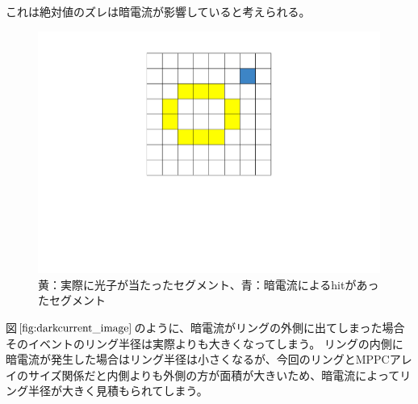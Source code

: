 \documentclass[uplatex, titlepage, dvipdfmx, 12pt, a4paper]{jsreport}
\begin{document}
      これは絶対値のズレは暗電流が影響していると考えられる。
      \begin{figure}[h]
        \begin{center} 
          \includegraphics[scale=0.4, clip]{image/dark_current_image.pdf}
          \caption{黄：実際に光子が当たったセグメント、青：暗電流によるhitがあったセグメント} 
          \label{fig:darkcurrent_image} 
        \end{center}
      \end{figure}
      図$\ref{fig:darkcurrent_image}$のように、暗電流がリングの外側に出てしまった場合そのイベントのリング半径は実際よりも大きくなってしまう。
      リングの内側に暗電流が発生した場合はリング半径は小さくなるが、今回のリングとMPPCアレイのサイズ関係だと内側よりも外側の方が面積が大きいため、暗電流によってリング半径が大きく見積もられてしまう。
\end{document}
